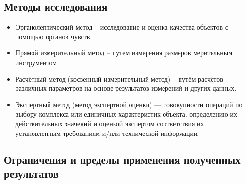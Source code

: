 \subsection{Методы исследования}
\begin{itemize}
\item  Органолептический метод – исследование и оценка качества объектов с помощью органов чувств.
\item 	Прямой измерительный метод – путем измерения  размеров  %
мерительным инструментом %
\item Расчётный метод (косвенный измерительный метод) – путём расчётов различных параметров на основе результатов измерений и других данных.
\item Экспертный метод (метод экспертной оценки) — совокупности операций по выбору комплекса или единичных характеристик объекта, определению их действительных значений и оценкой экспертом соответствия их установленным требованиям и/или технической информации.
\end{itemize}
%
%
\subsection{Ограничения и пределы применения полученных результатов}

